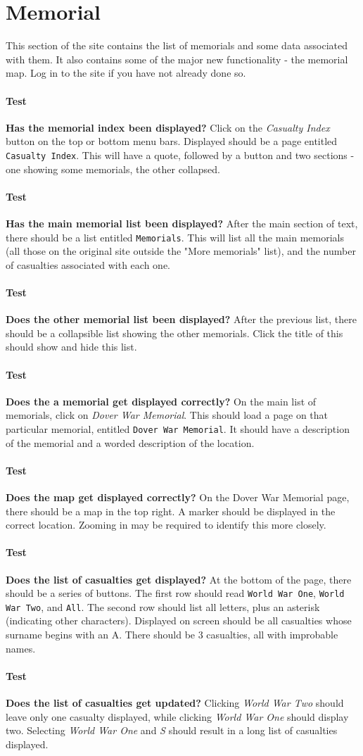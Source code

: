 \documentclass[12pt]{article}
\newcounter{Test}
\newcommand{\test}[1]{%
\stepcounter{Test}%
\paragraph{Test \theTest} \textbf{#1} }
\begin{document}
\section{Memorial}\label{sec:memorial}
This section of the site contains the list of memorials and some data associated with them. It also contains some of the major new functionality - the memorial map. Log in to the site if you have not already done so.

\test{Has the memorial index been displayed?}
Click on the \textit{Casualty Index} button on the top or bottom menu bars. Displayed should be a page entitled \texttt{Casualty Index}. This will have a quote, followed by a button and two sections - one showing some memorials, the other collapsed.

\test{Has the main memorial list been displayed?}
After the main section of text, there should be a list entitled \texttt{Memorials}. This will list all the main memorials (all those on the original site outside the "More memorials" list), and the number of casualties associated with each one.

\test{Does the other memorial list been displayed?}
After the previous list, there should be a collapsible list showing the other memorials. Click the title of this should show and hide this list.

\test{Does the a memorial get displayed correctly?}
On the main list of memorials, click on \textit{Dover War Memorial}. This should load a page on that particular memorial, entitled \texttt{Dover War Memorial}. It should have a description of the memorial and a worded description of the location.

\test{Does the map get displayed correctly?}
On the Dover War Memorial page, there should be a map in the top right. A marker should be displayed in the correct location. Zooming in may be required to identify this more closely.

\test{Does the list of casualties get displayed?}
At the bottom of the page, there should be a series of buttons. The first row should read \texttt{World War One}, \texttt{World War Two}, and \texttt{All}. The second row should list all letters, plus an asterisk (indicating other characters). Displayed on screen should be all casualties whose surname begins with an A. There should be 3 casualties, all with improbable names.

\test{Does the list of casualties get updated?}
Clicking \textit{World War Two} should leave only one casualty displayed, while clicking \textit{World War One} should display two. Selecting \textit{World War One} and \textit{S} should result in a long list of casualties displayed.
\end{document}

